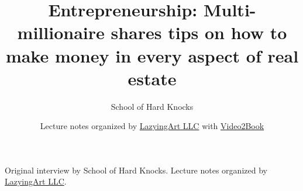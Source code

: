 \documentclass[11pt,oneside]{book}
\begin{document}
\frontmatter
\title{Entrepreneurship: Multi-millionaire shares tips on how to make money in every aspect of real estate}
\author{School of Hard Knocks}
\date{Lecture notes organized by \href{https://lazying.art}{LazyingArt LLC} with \href{https://github.com/lachlanchen/Video2Book}{Video2Book}}
\maketitle
\begin{center}
\small Original interview by School of Hard Knocks. Lecture notes organized by \href{https://lazying.art}{LazyingArt LLC}.
\end{center}
\clearpage
\mainmatter

\end{document}

